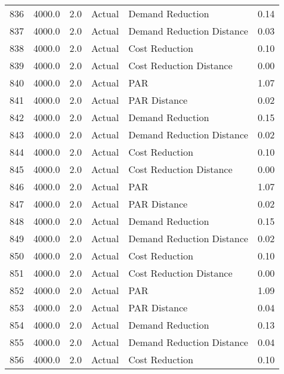 \begin{longtable}{lrrllr}
836  &       4000.0 &     2.0 &         Actual &           Demand Reduction &   0.14 \\
837  &       4000.0 &     2.0 &         Actual &  Demand Reduction Distance &   0.03 \\
838  &       4000.0 &     2.0 &         Actual &             Cost Reduction &   0.10 \\
839  &       4000.0 &     2.0 &         Actual &    Cost Reduction Distance &   0.00 \\
840  &       4000.0 &     2.0 &         Actual &                        PAR &   1.07 \\
841  &       4000.0 &     2.0 &         Actual &               PAR Distance &   0.02 \\
842  &       4000.0 &     2.0 &         Actual &           Demand Reduction &   0.15 \\
843  &       4000.0 &     2.0 &         Actual &  Demand Reduction Distance &   0.02 \\
844  &       4000.0 &     2.0 &         Actual &             Cost Reduction &   0.10 \\
845  &       4000.0 &     2.0 &         Actual &    Cost Reduction Distance &   0.00 \\
846  &       4000.0 &     2.0 &         Actual &                        PAR &   1.07 \\
847  &       4000.0 &     2.0 &         Actual &               PAR Distance &   0.02 \\
848  &       4000.0 &     2.0 &         Actual &           Demand Reduction &   0.15 \\
849  &       4000.0 &     2.0 &         Actual &  Demand Reduction Distance &   0.02 \\
850  &       4000.0 &     2.0 &         Actual &             Cost Reduction &   0.10 \\
851  &       4000.0 &     2.0 &         Actual &    Cost Reduction Distance &   0.00 \\
852  &       4000.0 &     2.0 &         Actual &                        PAR &   1.09 \\
853  &       4000.0 &     2.0 &         Actual &               PAR Distance &   0.04 \\
854  &       4000.0 &     2.0 &         Actual &           Demand Reduction &   0.13 \\
855  &       4000.0 &     2.0 &         Actual &  Demand Reduction Distance &   0.04 \\
856  &       4000.0 &     2.0 &         Actual &             Cost Reduction &   0.10 \\

\end{longtable}
